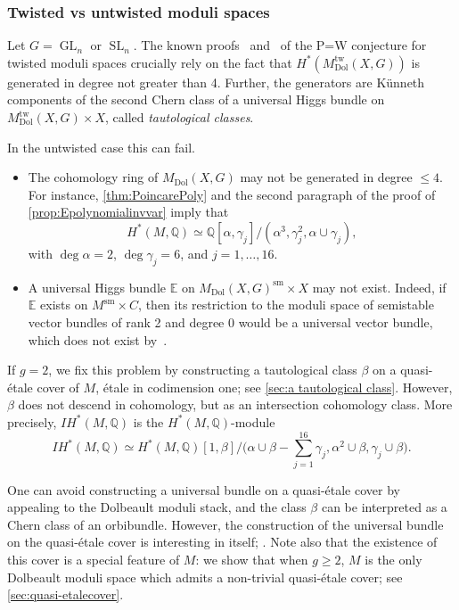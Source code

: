 \documentclass[JEP,XML,SOM,Unicode, NoEqCountersInSection,NoFloatCountersInSection,published]{cedram}
\let\ts\textstyle
\newcommand{\IH}{\mathit{IH}}
\theoremstyle{definition}
\newcommand{\QQ}{\mathbb{Q}}
\newcommand{\Gl}{\operatorname{GL}}
\newcommand{\Sl}{\operatorname{SL}}
\newcommand{\mdoltwisted}{M_{\mathrm{Dol}}^{\mathrm{tw}}(X,G)}
\newcommand{\MDolG}{{M}_{\mathrm{Dol}}(X,G)}
\begin{document}
\subsubsection*{Twisted vs untwisted moduli spaces} Let $G=\Gl_n$ or $\Sl_n$. The known proofs~\cite{deCataldoHauselMigliorini2012} and~\cite{deCataldoMaulikShen2019} of the P=W conjecture for twisted moduli spaces crucially rely on the fact that $H^*(\mdoltwisted)$ is generated in degree not greater than 4. Further, the generators are Künneth components of the second Chern class of a universal Higgs bundle on $\mdoltwisted \times X$, called \emph{tautological classes}.

In the untwisted case this can fail.
\begin{itemize}
\item The cohomology ring of $\MDolG$ may not be generated in degree $\leq 4$. For instance, \cref{thm:PoincarePoly} and the second paragraph of the proof of \cref{prop:Epolynomialinvvar} imply that\vspace*{-3pt}\enlargethispage{.5\baselineskip}%
\[
H^*(M, \QQ) \simeq \QQ[\alpha, \gamma_j]/(\alpha^3, \gamma_j^2, \alpha\cup \gamma_j),
\]
with $\deg \alpha =2$, $\deg \gamma_j = 6$, and $j=1, \ldots, 16$.
\item A universal Higgs bundle $\mathbb{E}$ on $\MDolG^{\mathrm{sm}}\!\times\! X$ may not exist. Indeed, if~$\mathbb{E}$ exists on $M^{\mathrm{sm}}\!\times\! C$, then its restriction to the moduli space of semistable vector bundles of rank 2 and degree 0 would be a universal vector bundle, which does not exist by~\cite{NR69}.
\end{itemize}

If $g=2$, we fix this problem by constructing a tautological class $\beta$ on a quasi-étale cover of $M$, \ie étale in codimension one; see \cref{sec:a tautological class}. However, $\beta$ does not descend in cohomology, but as an intersection cohomology class. More precisely, $\IH^*(M, \QQ)$ is the $H^*(M,\QQ)$-module\vspace*{-3pt}
\[
\IH^*(M, \QQ) \simeq H^*(M,\QQ) [ 1, \beta ]/\bigl(\alpha \cup \beta - \ts\sum^{16}_{j=1}\gamma_j, \alpha^2 \cup \beta, \gamma_j \cup \beta \bigr).
\]

One can avoid constructing a universal bundle on a quasi-étale cover by appealing to the Dolbeault moduli stack, and the class $\beta$ can be interpreted as a Chern class of an orbibundle. However, the construction of the universal bundle on the quasi-étale cover is interesting in itself; \cf \cite[\S 6.1]{HeuLoray19}. Note also that the existence of this cover is a special feature of $M$: we show that when $g \geq 2$, $M$ is the only Dolbeault moduli space which admits a non-trivial quasi-étale cover; see \cref{sec:quasi-etalecover}.
\end{document}
